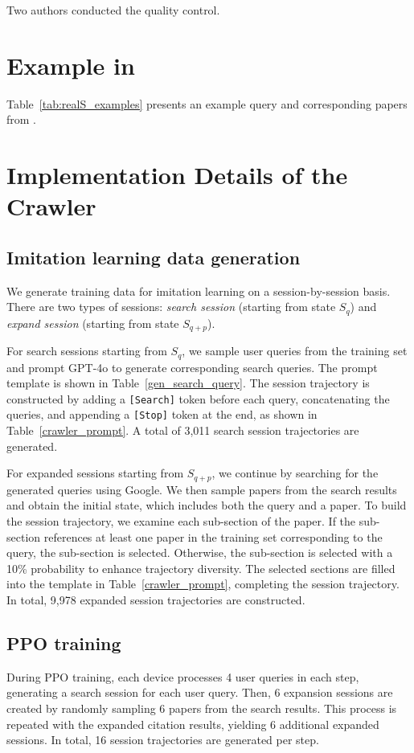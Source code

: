 Two authors conducted the quality control.

\section{Example in \realS}\label{data_example}

Table~\ref{tab:realS_examples} presents an example query and corresponding papers from \realS.

\section{Implementation Details of the Crawler}

\subsection{Imitation learning data generation}\label{crawler_detail}

We generate training data for imitation learning on a session-by-session basis. There are two types of sessions: \emph{search session} (starting from state $S_q$) and \emph{expand session} (starting from state $S_{q+p}$). 

For search sessions starting from $S_q$, we sample user queries from the \autoS training set and prompt GPT-4o to generate corresponding search queries. The prompt template is shown in Table~\ref{gen_search_query}. The session trajectory is constructed by adding a \texttt{[Search]} token before each query, concatenating the queries, and appending a \texttt{[Stop]} token at the end, as shown in Table~\ref{crawler_prompt}. A total of 3,011 search session trajectories are generated.

For expanded sessions starting from $S_{q+p}$, we continue by searching for the generated queries using Google. We then sample papers from the search results and obtain the initial state, which includes both the query and a paper. To build the session trajectory, we examine each sub-section of the paper. If the sub-section references at least one paper in the \autoS training set corresponding to the query, the sub-section is selected. Otherwise, the sub-section is selected with a 10\% probability to enhance trajectory diversity. The selected sections are filled into the template in Table~\ref{crawler_prompt}, completing the session trajectory. In total, 9,978 expanded session trajectories are constructed.

\subsection{PPO training}\label{ppo_training_detail}
During PPO training, each device processes 4 user queries in each step, generating a search session for each user query. Then, 6 expansion sessions are created by randomly sampling 6 papers from the search results. This process is repeated with the expanded citation results, yielding 6 additional expanded sessions. In total, 16 session trajectories are generated per step.

